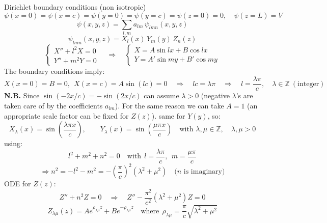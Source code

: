 \documentclass{article}
\begin{document}
\noindent
Dirichlet boundary conditions (non isotropic)
\begin{equation}
    \psi(x=0) = \psi(x=c) = \psi(y=0) = \psi(y=c) = \psi(z=0) = 0, \quad \psi(z=L) = V
\end{equation}
\begin{equation}
    \psi(x,y,z) = \sum_{l,m} a_{lm} \, \psi_{lm n}(x,y,z)
\end{equation}
\begin{equation}
    \psi_{lm n}(x,y,z) = X_l(x)\, Y_m(y)\, Z_n(z)
\end{equation}
\begin{equation}
    \begin{cases}
X'' + l^2 X = 0 \\
Y'' + m^2 Y = 0
\end{cases}
\quad \Rightarrow \quad
\begin{cases}
X = A \sin l x + B \cos l x \\
Y = A' \sin m y + B' \cos m y
\end{cases}
\end{equation}
The boundary conditions imply:
\begin{equation}
    X(x=0) = B = 0, \ \ X(x=c) = A \sin(l c) = 0 
\quad \Rightarrow \quad l c = \lambda \pi 
\quad \Rightarrow \quad l = \frac{\lambda \pi}{c}, 
\quad \lambda \in \mathbb{Z} \ (\text{integer})
\end{equation}
\textbf{N.B.} Since $\sin (-2x/c)=-\sin(2x/c)$ can assume $\lambda>0$ (negative $\lambda$’s are taken care of by the coefficients $a_{lm}$). For the same reason we can take $A=1$ (an appropriate scale factor can be fixed for $Z(z)$). same for $Y(y)$, so:
\begin{equation}
    X_\lambda(x) = \sin\left( \frac{\lambda \pi x}{c} \right),
\qquad
Y_\lambda(x) = \sin\left( \frac{\mu \pi x}{c} \right)
\quad \text{with } \lambda, \mu \in \mathbb{Z}, \quad \lambda, \mu > 0
\end{equation}
using:
\begin{equation}
    l^2 + m^2 + n^2 = 0 \quad \text{with} \ \ l = \frac{\lambda \pi}{c}, \ \ m = \frac{\mu \pi}{c}
\end{equation}
\begin{equation}
    \Rightarrow n ^2 = -l^2 - m^2 = -\left( \frac{\pi}{c} \right) ^2 (\lambda^2 + \mu^2 ) \quad \text{($n$ is imaginary)}
\end{equation}
ODE for $Z(z)$:
\begin{equation}
    Z'' + n^2 Z = 0 
\quad \Rightarrow \quad 
Z'' - \frac{\pi^2}{c^2}(\lambda^2 + \mu^2) Z = 0
\end{equation}
\begin{equation}
    Z_{\lambda\mu}(z) = A e^{\rho_{\lambda\mu} z} + B e^{-\rho_{\lambda\mu} z}
\quad \text{where} \ \  \rho_{\lambda\mu} = \frac{\pi}{c} \sqrt{\lambda^2 + \mu^2}
\end{equation}
\end{document}
